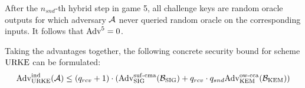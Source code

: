 After the $n_{snd}$-th hybrid step in game 5, all challenge keys are random oracle outputs for which adversary $\mathcal{A}$ never queried random oracle on the corresponding inputs.
It follows that $\mathrm{Adv}^5=0$.

Taking the advantages together, the following concrete security bound for scheme $\mathrm{URKE}$ can be formulated:
\[\mathrm{Adv}_{\mathrm{URKE}}^{\mathrm{ind}}(\mathcal{A}) \leq (q_{rcv}+1)\cdot(\mathrm{Adv}_{\mathrm{SIG}}^{\mathrm{suf}\text{-}\mathrm{cma}}(\mathcal{B}_{\mathrm{SIG}})+q_{rcv}\cdot q_{snd}\mathrm{Adv}_{\mathrm{KEM}}^{\mathrm{ow}\text{-}\mathrm{cca}}(\mathcal{B}_{\mathrm{KEM}}))\] 


%     

%     
